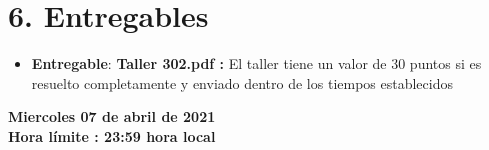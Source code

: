 \documentclass[base=hide,11pt]{elegantbook}
\begin{document}
\section*{6. Entregables}

\begin{itemize}
\item {\bf Entregable}: \textcolor{col4}{\bf Taller 302.pdf :} El taller tiene un valor de 30 puntos si es resuelto completamente y enviado dentro de los tiempos establecidos
\end{itemize}
\vspace{1cm}

\textcolor{col4}{\bf Miercoles 07 de abril de 2021}\\
\textcolor{col4}{\bf Hora límite : 23:59  hora  local}



\end{document}

